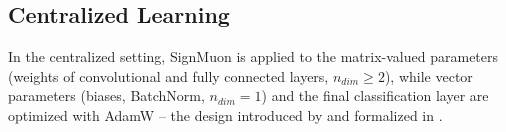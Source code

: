 \documentclass{article}
\begin{document}
\subsection{Centralized Learning}
In the centralized setting, SignMuon is applied to the matrix-valued parameters (weights of convolutional and fully connected layers, $n_{dim}\ge 2$), while vector parameters (biases, BatchNorm, $n_{dim} = 1$) and the final classification layer are optimized with AdamW -- the design introduced by \citet{jordan2024muon} and formalized in \cite{li2025note, riabinin2025gluon}.
\end{document}
